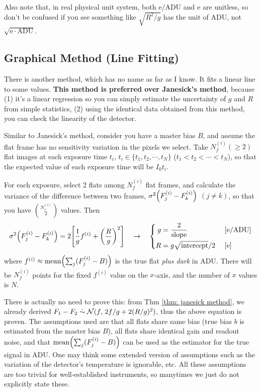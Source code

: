 Also note that, in real physical unit system, both $ \mathrm{e/ADU} $ and $ \mathrm{e} $ are unitless, so don't be confused if you see something like $ \sqrt{R^2/g} $ has the unit of ADU, not $ \sqrt{\mathrm{e \cdot ADU}} $.


\subsection{Graphical Method (Line Fitting) }
There is another method, which has no name as far as I know. It fits a linear line to some values. \textbf{This method is preferred over Janesick's method}, because (1) it's a linear regression so you can simply estimate the uncertainty of $ g $ and $ R $ from simple statistics, (2) using the identical data obtained from this method, you can check the linearity of the detector. 

Similar to Janesick's method, consider you have a master bias $ B $, and assume the flat frame has no sensitivity variation in the pixels we select. Take $ N^{(i)}_f (\ge 2) $ flat images at each exposure time $ t_i $, $ t_i \in \{ t_1, t_2, \cdots, t_N \} $ ($ t_1 < t_2 < \cdots < t_N $), so that the expected value of each exposure time will be $ I_0 t_i $. 

\begin{thm} 
For each exposure, select 2 flats among $  N^{(i)}_f $ flat frames, and calculate the variance of the difference between two frames, $ \sigma^2 \qty({F^{(i)}_j - F^{(i)}_k}) $ $ (j \neq k) $, so that you have $ \binom{N_f^{(i)}}{2} $ values. Then
\begin{equation}
  \sigma^2 \qty({F^{(i)}_j - F^{(i)}_k})
    = 2\qty [ \frac{1}{g} f^{(i)} + \qty(\frac{R}{g})^2 ]
  \quad\rightarrow\quad
  \left \{
  \begin{aligned}
    g &= \frac{2}{\mathrm{slope}} &&~\mathrm{[e/ADU]} \\
    R &= g \sqrt{\mathrm{intercept}}/2 &&~\mathrm{[e]}
  \end{aligned}
  \right .
\end{equation}
where $ f^{(i)} \approx \mathrm{mean} \qty( \sum_j (F^{(i)}_j - B) ) $ is the true flat \emph{plus dark} in ADU. There will be $  N^{(i)}_f $ points for the fixed $ f^{(i)} $ value on the $ x $-axis, and the number of $ x $ values is $ N $.
\end{thm}

There is actually no need to prove this: from Thm \ref{thm: janesick method}, we already derived $ F_1 - F_2 \mathrel{\dot{\sim}} \mathcal{N} (f,\, 2f/g + 2(R/g)^2) $, thus the above equation is proven. The assumptions used are that all flats share same bias (true bias $ b $ is estimated from the master bias $ B $), all flats share identical gain and readout noise, and that $ \mathrm{mean} \qty( \sum_j (F^{(i)}_j - B) ) $ can be used as the estimator for the true signal in ADU. One may think some extended version of assumptions such as the variation of the detector's temperature is ignorable, etc. All these assumptions are too trivial for well-established instruments, so manytimes we just do not explicitly state these.

